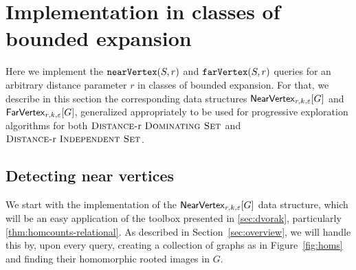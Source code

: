 \newcommand{\Labs}{\Lambda}
\newcommand{\lab}{\lambda}
\newcommand{\length}{\mathsf{len}}

\newcommand{\Mm}{\mathcal{M}}

\section{Implementation in classes of bounded expansion}\label{sec:implementation}

Here we implement the $\near{S,r}$ and $\far{S,r}$ queries for an arbitrary distance parameter $r$ in classes of bounded expansion. 
For that, we describe in this section the corresponding data structures $\nearVertexDS{G}{r,k,\eps}$
and $\farVertexDS{G}{r,k,\eps}$, generalized appropriately to be used for progressive exploration
algorithms for both $\drds{r }$ and $\dris{r }$.


\subsection{Detecting near vertices}

We start with the implementation of the $\nearVertexDS{G}{r,k,\eps}$ data structure, which will be an easy application of the toolbox presented in \cref{sec:dvorak}, particularly \cref{thm:homcounts-relational}.
As described in Section~\ref{sec:overview}, we will handle this by, upon every query,
creating a collection of graphs as in Figure~\ref{fig:homs} and finding their homomorphic rooted images in $G$.

